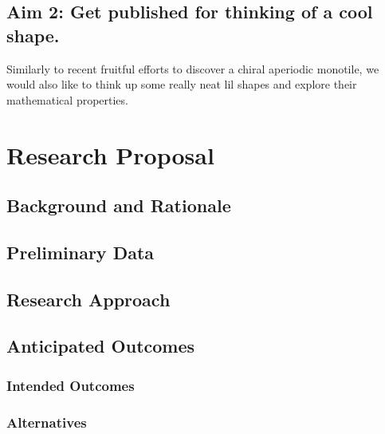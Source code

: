 \documentclass[phd,tocprelim,11pt]{cornell_rpa}
\begin{document}
\section{Aim 2: Get published for thinking of a cool shape.}
Similarly to recent fruitful efforts to discover a chiral aperiodic monotile\cite{smith_chiral_2023}, we would also like to think up some really neat lil shapes and explore their mathematical properties.

\chapter{Research Proposal}

\section{Background and Rationale}

\section{Preliminary Data}

\section{Research Approach}

\section{Anticipated Outcomes}

\subsection{Intended Outcomes}

\subsection{Alternatives}

\twocolumn


\end{document}
